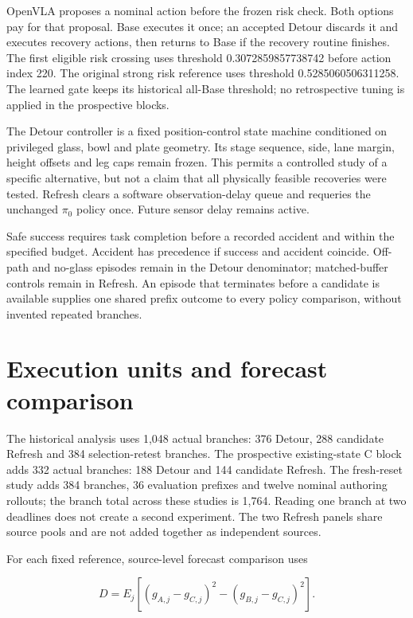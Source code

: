 OpenVLA proposes a nominal action before the frozen risk check. Both options pay for that proposal. Base executes it once; an accepted Detour discards it and executes recovery actions, then returns to Base if the recovery routine finishes. The first eligible risk crossing uses threshold 0.3072859857738742 before action index 220. The original strong risk reference uses threshold 0.5285060506311258. The learned gate keeps its historical all-Base threshold; no retrospective tuning is applied in the prospective blocks.


The Detour controller is a fixed position-control state machine conditioned on privileged glass, bowl and plate geometry. Its stage sequence, side, lane margin, height offsets and leg caps remain frozen. This permits a controlled study of a specific alternative, but not a claim that all physically feasible recoveries were tested. Refresh clears a software observation-delay queue and requeries the unchanged $\pi_0$ policy once. Future sensor delay remains active.


Safe success requires task completion before a recorded accident and within the specified budget. Accident has precedence if success and accident coincide. Off-path and no-glass episodes remain in the Detour denominator; matched-buffer controls remain in Refresh. An episode that terminates before a candidate is available supplies one shared prefix outcome to every policy comparison, without invented repeated branches.


\section{Execution units and forecast comparison}

The historical analysis uses 1,048 actual branches: 376 Detour, 288 candidate Refresh and 384 selection-retest branches. The prospective existing-state C block adds 332 actual branches: 188 Detour and 144 candidate Refresh. The fresh-reset study adds 384 branches, 36 evaluation prefixes and twelve nominal authoring rollouts; the branch total across these studies is 1,764. Reading one branch at two deadlines does not create a second experiment. The two Refresh panels share source pools and are not added together as independent sources.


For each fixed reference, source-level forecast comparison uses


\begin{equation}D=E_j[(g_{A,j}-g_{C,j})^2-(g_{B,j}-g_{C,j})^2].\end{equation}

